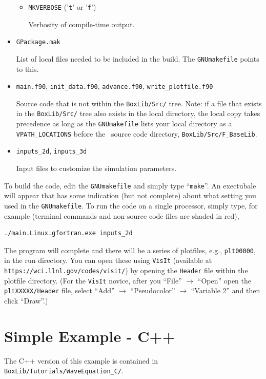 \begin{itemize}
\begin{itemize}
    \item {\tt MKVERBOSE} ('{\tt t}' or '{\tt f}')

    Verbosity of compile-time output.

  \end{itemize}

\item {\tt GPackage.mak}

List of local files needed to be included in the build.  The {\tt GNUmakefile} points to this.

\item {\tt main.f90}, {\tt init\_data.f90}, {\tt advance.f90}, {\tt write\_plotfile.f90}

Source code that is not within the {\tt BoxLib/Src/} tree.  Note: if a file that exists in the
{\tt BoxLib/Src/} tree also exists in the local directory, the local copy takes precedence
as long as the {\tt GNUmakefile} lists your local directory as a {\tt VPATH\_LOCATIONS} 
before the \BoxLib\ source code directory, {\tt BoxLib/Src/F\_BaseLib}.

\item {\tt inputs\_2d}, {\tt inputs\_3d}

Input files to customize the simulation parameters.

\end{itemize}

To build the code, edit the {\tt GNUmakefile} and simply type ``{\tt make}''.  An 
exectubale will appear that has some indication (but not complete)
about what setting you used in the {\tt GNUmakefile}.  To run the code on a single processor,
simply type, for example (terminal commands and non-source code files are shaded in red),
\begin{lstlisting}[backgroundcolor=\color{light-red}]
./main.Linux.gfortran.exe inputs_2d
\end{lstlisting}
The program will complete and there will be a series of plotfiles, e.g., {\tt plt00000}, in the run directory.
You can open these using {\tt VisIt} (available at {\tt https://wci.llnl.gov/codes/visit/}) by opening
the {\tt Header} file within the plotfile directory.  (For the {\tt VisIt} novice, after you 
``File'' $\rightarrow$ ``Open'' open the {\tt pltXXXXX/Header}
file, select ``Add'' $\rightarrow$ ``Pseudocolor'' $\rightarrow$ ``Variable 2'' and then click ``Draw''.)

\section{Simple Example - C++}
The C++ version of this example is contained in {\tt BoxLib/Tutorials/WaveEquation\_C/}.

